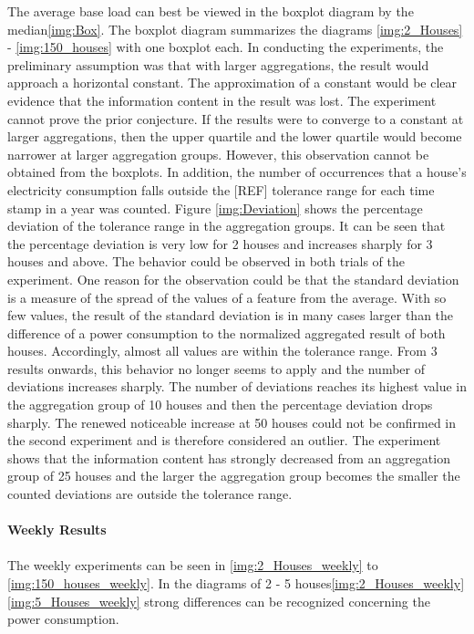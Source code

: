 The average base load can best be viewed in the boxplot diagram by the median\ref{img:Box}. The boxplot diagram summarizes the diagrams \ref{img:2_Houses} - \ref{img:150_houses} with one boxplot each. In conducting the experiments, the preliminary assumption was that with larger aggregations, the result would approach a horizontal constant. The approximation of a constant would be clear evidence that the information content in the result was lost. The experiment cannot prove the prior conjecture. If the results were to converge to a constant at larger aggregations, then the upper quartile and the lower quartile would become narrower at larger aggregation groups. However, this observation cannot be obtained from the boxplots. 
In addition, the number of occurrences that a house's electricity consumption falls outside the [REF] tolerance range for each time stamp in a year was counted. Figure \ref{img:Deviation} shows the percentage deviation of the tolerance range in the aggregation groups. It can be seen that the percentage deviation is very low for 2 houses and increases sharply for 3 houses and above. The behavior could be observed in both trials of the experiment. One reason for the observation could be that the standard deviation is a measure of the spread of the values of a feature from the average. With so few values, the result of the standard deviation is in many cases larger than the difference of a power consumption to the normalized aggregated result of both houses. Accordingly, almost all values are within the tolerance range. From 3 results onwards, this behavior no longer seems to apply and the number of deviations increases sharply. The number of deviations reaches its highest value in the aggregation group of 10 houses and then the percentage deviation drops sharply. The renewed noticeable increase at 50 houses could not be confirmed in the second experiment and is therefore considered an outlier. The experiment shows that the information content has strongly decreased from an aggregation group of 25 houses and the larger the aggregation group becomes the smaller the counted deviations are outside the tolerance range.
\\
\\
\textbf{Weekly Results}
\\
\\
The weekly experiments can be seen in \ref{img:2_Houses_weekly} to \ref{img:150_houses_weekly}. In the diagrams of 2 - 5 houses\ref{img:2_Houses_weekly}\ref{img:5_Houses_weekly} strong differences can be recognized concerning the power consumption.
